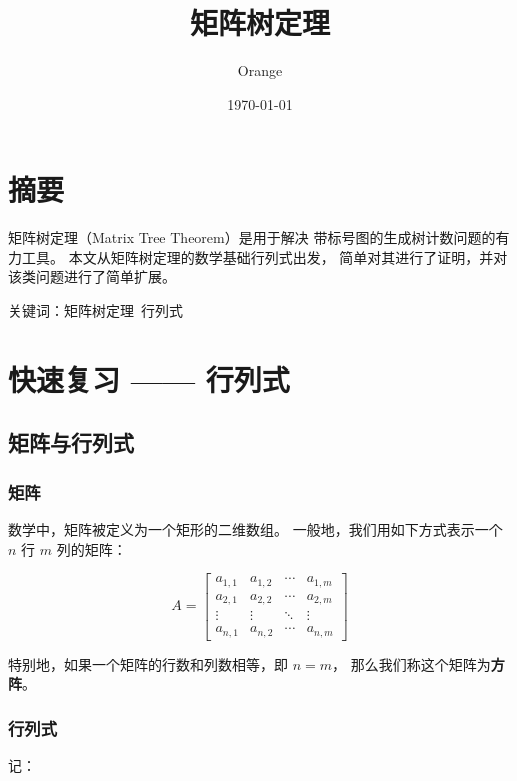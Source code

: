 \documentclass[UTF8]{article}
\title{矩阵树定理}
\author{Orange}
\date{\today}
\begin{document}
	
	\yahei

	\maketitle

	\section{摘要}
	
	矩阵树定理（Matrix Tree Theorem）是用于解决
	带标号图的生成树计数问题的有力工具。
	本文从矩阵树定理的数学基础行列式出发，
	简单对其进行了证明，并对该类问题进行了简单扩展。

	\bigskip

	关键词：矩阵树定理~行列式

	\section{快速复习 —— 行列式}

	\subsection{矩阵与行列式}

	\subsubsection{矩阵}

	数学中，矩阵被定义为一个矩形的二维数组。
	一般地，我们用如下方式表示一个 $n$ 行 $m$ 列的矩阵：

	\begin{equation*}
		A = 
		\begin{bmatrix}
			a_{1, 1} & a_{1, 2} & \cdots & a_{1, m}
			\\
			a_{2, 1} & a_{2, 2} & \cdots & a_{2, m}
			\\
			\vdots & \vdots & \ddots & \vdots
			\\
			a_{n, 1} & a_{n, 2} & \cdots & a_{n, m}
		\end{bmatrix}
	\end{equation*}

	特别地，如果一个矩阵的行数和列数相等，即 $n = m$，
	那么我们称这个矩阵为\textbf{方阵}。

	\subsubsection{行列式}

	记：
\end{document}
